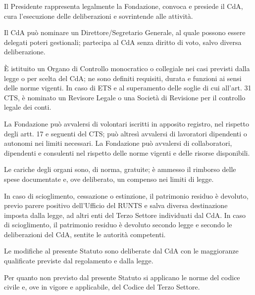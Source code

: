 \documentclass[11pt,a4paper]{article}
\begin{document}
 Il Presidente rappresenta legalmente la Fondazione, convoca e presiede il CdA, cura l'esecuzione delle deliberazioni e sovrintende alle attività.

 Il CdA può nominare un Direttore/Segretario Generale, al quale possono essere delegati poteri gestionali; partecipa al CdA senza diritto di voto, salvo diversa deliberazione.

 È istituito un Organo di Controllo monocratico o collegiale nei casi previsti dalla legge o per scelta del CdA; ne sono definiti requisiti, durata e funzioni ai sensi delle norme vigenti.
\ifETS
{} In caso di ETS e al superamento delle soglie di cui all'art. 31 CTS, è nominato un Revisore Legale o una Società di Revisione per il controllo legale dei conti.
\fi

\ifETS
{} La Fondazione può avvalersi di volontari iscritti in apposito registro, nel rispetto degli artt. 17 e seguenti del CTS; può altresì avvalersi di lavoratori dipendenti o autonomi nei limiti necessari.
\else
{} La Fondazione può avvalersi di collaboratori, dipendenti e consulenti nel rispetto delle norme vigenti e delle risorse disponibili.
\fi

 Le cariche degli organi sono, di norma, gratuite; è ammesso il rimborso delle spese documentate e, ove deliberato, un compenso nei limiti di legge.

\ifETS
{} In caso di scioglimento, cessazione o estinzione, il patrimonio residuo è devoluto, previo parere positivo dell'Ufficio del RUNTS e salva diversa destinazione imposta dalla legge, ad altri enti del Terzo Settore individuati dal CdA.
\else
{} In caso di scioglimento, il patrimonio residuo è devoluto secondo legge e secondo le deliberazioni del CdA, sentite le autorità competenti.
\fi

 Le modifiche al presente Statuto sono deliberate dal CdA con le maggioranze qualificate previste dal regolamento e dalla legge.

 Per quanto non previsto dal presente Statuto si applicano le norme del codice civile e, ove in vigore e applicabile, del Codice del Terzo Settore.

\vspace{2\baselineskip}
\DataLuogo{\FondazioneCitta}{\today}
\end{document}
